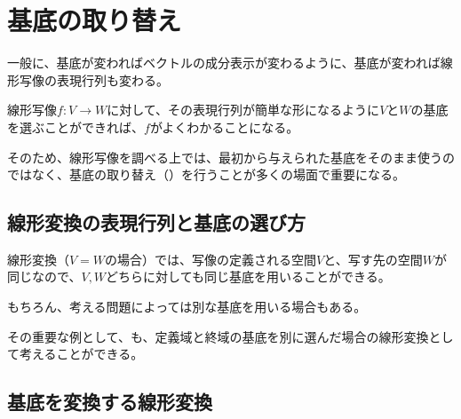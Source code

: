 \documentclass[../../../topic_linear-algebra]{subfiles}
\begin{document}
\sectionline
\section{基底の取り替え}

一般に、基底が変わればベクトルの成分表示が変わるように、基底が変われば線形写像の表現行列も変わる。

\br

線形写像$f\colon V \to W$に対して、その表現行列が簡単な形になるように$V$と$W$の基底を選ぶことができれば、$f$がよくわかることになる。

そのため、線形写像を調べる上では、最初から与えられた基底をそのまま使うのではなく、基底の取り替え（）を行うことが多くの場面で重要になる。

\subsection{線形変換の表現行列と基底の選び方}

線形変換（$V=W$の場合）では、写像の定義される空間$V$と、写す先の空間$W$が同じなので、$V,W$どちらに対しても同じ基底を用いることができる。
\begin{center}
\end{center}

\br

\begin{mindflow}
\end{mindflow}

もちろん、考える問題によっては別な基底を用いる場合もある。

その重要な例として、も、定義域と終域の基底を別に選んだ場合の線形変換として考えることができる。

\subsection{基底を変換する線形変換}
\end{document}
